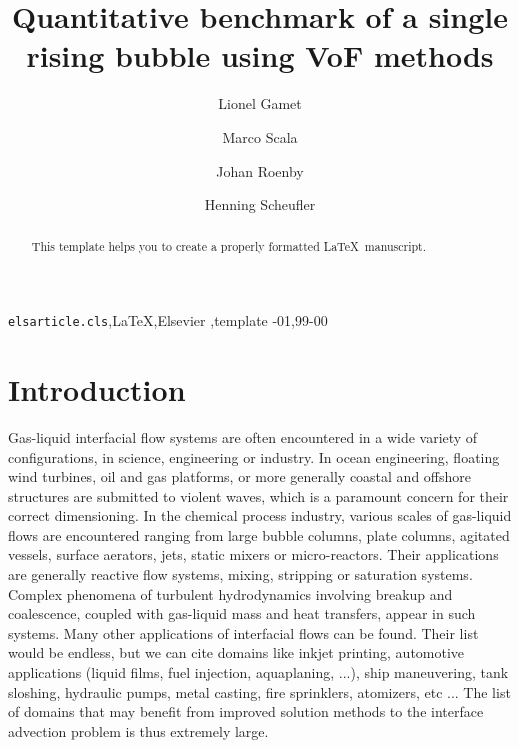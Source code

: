 \documentclass[review]{elsarticle}
\begin{document}
\begin{frontmatter}

\title{Quantitative benchmark of a single rising bubble using VoF methods}

\author[ifpenaddress]{Lionel Gamet}

\author[ifpenaddress]{Marco Scala}

\author[stromningaddress]{Johan Roenby}

\author[dlraddress]{Henning Scheufler}

\address[ifpenaddress]{IFPEN Lyon, Process Experimentation Division, 69360 Solaize, France}
\address[stromningaddress]{STROMNING, Luftmarinegade 62, 1432 K{\o}benhavn K, Denmark}
\address[dlraddress]{DLR German Aerospace Center, Institute of Space Systems, 28359 Bremen, Germany}

\begin{abstract}
This template helps you to create a properly formatted \LaTeX\ manuscript.
\end{abstract}

\begin{keyword}
\texttt{elsarticle.cls}\sep \LaTeX\sep Elsevier \sep template
-01\sep  99-00
\end{keyword}

\end{frontmatter}

\linenumbers

\section{Introduction}

Gas-liquid interfacial flow systems are often encountered in a wide variety of configurations, in science, engineering or industry. In ocean engineering, floating wind turbines, oil and gas platforms, or more generally coastal and offshore structures are submitted to violent waves, which is a paramount concern for their correct dimensioning. In the chemical process industry, various scales of gas-liquid flows are encountered ranging from large bubble columns, plate columns, agitated vessels, surface aerators, jets, static mixers or micro-reactors. Their applications are generally reactive flow systems, mixing, stripping or saturation systems. Complex phenomena of turbulent hydrodynamics involving breakup and coalescence, coupled with gas-liquid mass and heat transfers, appear in such systems. Many other applications of interfacial flows can be found. Their list would be endless, but we can cite domains like inkjet printing, automotive applications (liquid films, fuel injection, aquaplaning, ...), ship maneuvering, tank sloshing, hydraulic pumps, metal casting, fire sprinklers, atomizers, etc ... The list of domains that may benefit from improved solution methods to the interface advection problem is thus extremely large. 
\end{document}

